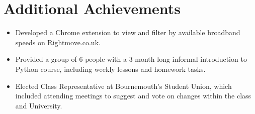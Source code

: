 \section{Additional Achievements}

\begin{itemize}
	\setlength\itemsep{0em}
	\item Developed a Chrome extension to view and filter by available broadband speeds on Rightmove.co.uk.
	\item Provided a group of 6 people with a 3 month long informal introduction to Python course, including weekly lessons and homework tasks. 
	\item Elected Class Representative at Bournemouth's Student Union, which included attending meetings to suggest and vote on changes within the class and University.
\end{itemize}